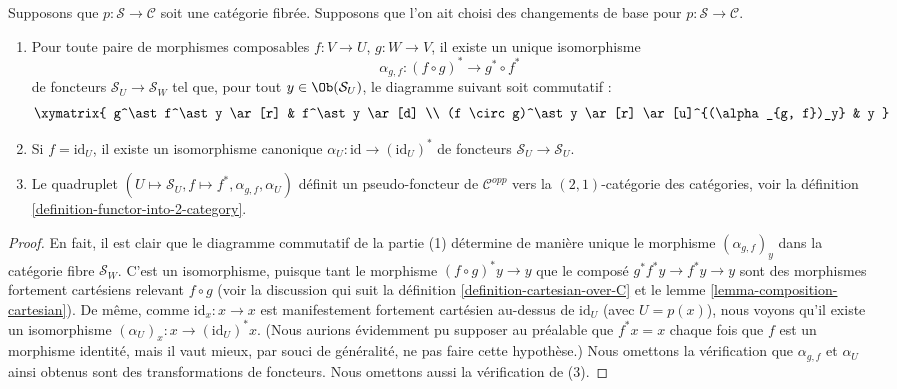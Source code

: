 \begin{lemma}
\label{lemma-fibred}
Supposons que $p : \mathcal{S} \to \mathcal{C}$ soit une catégorie fibrée.
Supposons que l'on ait choisi des changements de base pour
$p : \mathcal{S} \to \mathcal{C}$.
\begin{enumerate}
\item Pour toute paire de morphismes composables $f : V \to U$,
$g : W \to V$, il existe un unique isomorphisme
$$
\alpha_{g, f} :
(f \circ g)^\ast
\longrightarrow
g^\ast \circ f^\ast
$$
de foncteurs $\mathcal{S}_U \to \mathcal{S}_W$ tel que, pour tout
$y\in \Ob(\mathcal{S}_U)$, le diagramme suivant soit commutatif :
$$
\xymatrix{
g^\ast f^\ast y \ar[r]
&
f^\ast y \ar[d] \\
(f \circ g)^\ast y \ar[r]
\ar[u]^{(\alpha_{g, f})_y}
&
y
}
$$
\item Si $f = \text{id}_U$, il existe un isomorphisme canonique
$\alpha_U : \text{id} \to (\text{id}_U)^*$ de foncteurs
$\mathcal{S}_U \to \mathcal{S}_U$.
\item Le quadruplet
$(U \mapsto \mathcal{S}_U, f \mapsto f^*, \alpha_{g, f}, \alpha_U)$
définit un pseudo-foncteur de $\mathcal{C}^{opp}$ vers la
$(2, 1)$-catégorie des catégories, voir la
définition \ref{definition-functor-into-2-category}.
\end{enumerate}
\end{lemma}

\begin{proof}
En fait, il est clair que le diagramme commutatif de la partie (1)
détermine de manière unique le morphisme
$(\alpha_{g, f})_y$ dans la catégorie fibre
$\mathcal{S}_W$. C'est un isomorphisme, puisque tant le morphisme
$(f \circ g)^*y \to y$ que le composé
$g^*f^*y \to f^*y \to y$ sont des morphismes fortement cartésiens
relevant $f \circ g$ (voir la discussion qui suit la
définition \ref{definition-cartesian-over-C} et le
lemme \ref{lemma-composition-cartesian}). De même, comme
$\text{id}_x : x \to x$ est manifestement fortement cartésien
au-dessus de $\text{id}_U$ (avec $U = p(x)$), nous voyons qu'il existe
un isomorphisme $(\alpha_U)_x : x \to (\text{id}_U)^*x$.
(Nous aurions évidemment pu supposer au préalable que $f^*x = x$
chaque fois que $f$ est un morphisme identité, mais il vaut mieux,
par souci de généralité, ne pas faire cette hypothèse.)
Nous omettons la vérification que $\alpha_{g, f}$ et
$\alpha_U$ ainsi obtenus sont des transformations de foncteurs.
Nous omettons aussi la vérification de (3).
\end{proof}

